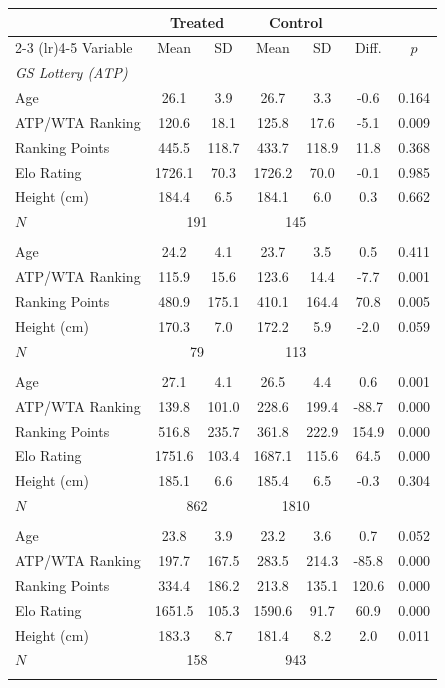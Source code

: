 \begin{tabular}{l cccc cc}
\toprule
 & \multicolumn{2}{c}{Treated} & \multicolumn{2}{c}{Control} & & \\
\cmidrule(lr){2-3} \cmidrule(lr){4-5}
Variable & Mean & SD & Mean & SD & Diff. & $p$ \\
\midrule
\multicolumn{7}{l}{\textit{GS Lottery (ATP)}} \\
\quad Age & 26.1 & 3.9 & 26.7 & 3.3 & -0.6 & 0.164 \\
\quad ATP/WTA Ranking & 120.6 & 18.1 & 125.8 & 17.6 & -5.1 & 0.009 \\
\quad Ranking Points & 445.5 & 118.7 & 433.7 & 118.9 & 11.8 & 0.368 \\
\quad Elo Rating & 1726.1 & 70.3 & 1726.2 & 70.0 & -0.1 & 0.985 \\
\quad Height (cm) & 184.4 & 6.5 & 184.1 & 6.0 & 0.3 & 0.662 \\
\quad $N$ & \multicolumn{2}{c}{191} & \multicolumn{2}{c}{145} & & \\
\addlinespace
\multicolumn{7}{l}{\textit{GS Lottery (WTA)}} \\
\quad Age & 24.2 & 4.1 & 23.7 & 3.5 & 0.5 & 0.411 \\
\quad ATP/WTA Ranking & 115.9 & 15.6 & 123.6 & 14.4 & -7.7 & 0.001 \\
\quad Ranking Points & 480.9 & 175.1 & 410.1 & 164.4 & 70.8 & 0.005 \\
\quad Height (cm) & 170.3 & 7.0 & 172.2 & 5.9 & -2.0 & 0.059 \\
\quad $N$ & \multicolumn{2}{c}{79} & \multicolumn{2}{c}{113} & & \\
\addlinespace
\multicolumn{7}{l}{\textit{Non-GS Selection Model (ATP)}} \\
\quad Age & 27.1 & 4.1 & 26.5 & 4.4 & 0.6 & 0.001 \\
\quad ATP/WTA Ranking & 139.8 & 101.0 & 228.6 & 199.4 & -88.7 & 0.000 \\
\quad Ranking Points & 516.8 & 235.7 & 361.8 & 222.9 & 154.9 & 0.000 \\
\quad Elo Rating & 1751.6 & 103.4 & 1687.1 & 115.6 & 64.5 & 0.000 \\
\quad Height (cm) & 185.1 & 6.6 & 185.4 & 6.5 & -0.3 & 0.304 \\
\quad $N$ & \multicolumn{2}{c}{862} & \multicolumn{2}{c}{1810} & & \\
\addlinespace
\multicolumn{7}{l}{\textit{First-LL-Only}} \\
\quad Age & 23.8 & 3.9 & 23.2 & 3.6 & 0.7 & 0.052 \\
\quad ATP/WTA Ranking & 197.7 & 167.5 & 283.5 & 214.3 & -85.8 & 0.000 \\
\quad Ranking Points & 334.4 & 186.2 & 213.8 & 135.1 & 120.6 & 0.000 \\
\quad Elo Rating & 1651.5 & 105.3 & 1590.6 & 91.7 & 60.9 & 0.000 \\
\quad Height (cm) & 183.3 & 8.7 & 181.4 & 8.2 & 2.0 & 0.011 \\
\quad $N$ & \multicolumn{2}{c}{158} & \multicolumn{2}{c}{943} & & \\
\addlinespace
\bottomrule
\end{tabular}
